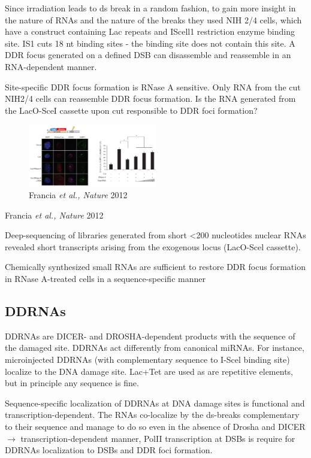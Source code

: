 Since irradiation leads to ds break in a random fashion, to gain more insight in the nature of RNAs and the nature of the breaks they used NIH 2/4 cells, which have a construct containing Lac repeats and IScell1 restriction enzyme binding site. IS1 cuts 18 nt binding sites - the binding site does not contain this site. A DDR focus generated on a defined DSB can disassemble and reassemble in an RNA-dependent manner.

Site-specific DDR focus formation is RNase A sensitive. Only RNA from the cut NIH2/4 cells can reassemble DDR focus formation. Is the RNA generated from the LacO-SceI cassette upon cut responsible to DDR foci formation?

\begin{figure}
\centering
\includegraphics[width=0.5\textwidth]{Screen_Shot_2022-12-07_at_09-03-41.png}
\caption{Francia \emph{et al., Nature} 2012}
\end{figure}

Francia \emph{et al., Nature} 2012

Deep-sequencing of libraries generated from short \textless200 nucleotides nuclear RNAs revealed short transcripts arising from the exogenous locus (LacO-Scel cassette).

Chemically synthesized small RNAs are sufficient to restore DDR focus formation in RNase A-treated cells in a sequence-specific manner

\hypertarget{ddrnas}{%
\subsection{DDRNAs}\label{ddrnas}}

DDRNAs are DICER- and DROSHA-dependent products with the sequence of the damaged site. DDRNAs act differently from canonical miRNAs. For instance, microinjected DDRNAs (with complementary sequence to I-Scel binding site) localize to the DNA damage site. Lac+Tet are used as are repetitive elements, but in principle any sequence is fine.

Sequence-specific localization of DDRNAs at DNA damage sites is functional and transcription-dependent. The RNAs co-localize by the ds-breaks complementary to their sequence and manage to do so even in the absence of Drosha and DICER $\rightarrow$ transcription-dependent manner, PolII transcription at DSBs is require for DDRNAs localization to DSBs and DDR foci formation.

